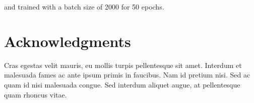 \documentclass[10pt,letterpaper]{article}
\begin{document}
and trained with a batch size of 2000 for 50 epochs.






\section*{Acknowledgments}
Cras egestas velit mauris, eu mollis turpis pellentesque sit amet. Interdum et malesuada fames ac ante ipsum primis in faucibus. Nam id pretium nisi. Sed ac quam id nisi malesuada congue. Sed interdum aliquet augue, at pellentesque quam rhoncus vitae.
\end{document}
